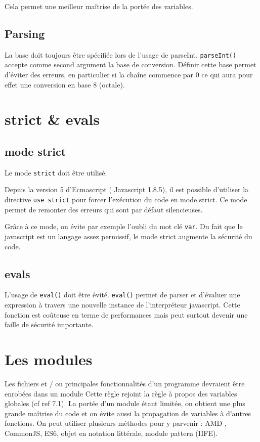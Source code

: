 			Cela permet une meilleur maîtrise de la portée des variables.

		\subsection{Parsing}
			La base doit toujours être spécifiée lors de l'usage de parseInt. \verb+parseInt()+ accepte comme second argument la base de conversion. Définir cette base permet d'éviter des erreurs, en particulier si la chaîne commence par 0 ce qui aura pour effet une conversion en base 8 (octale).

	\section{strict \& evals}
		\subsection{mode strict}
			Le mode \verb+strict+ doit être utilisé.

			Depuis la version 5 d'Ecmascript ( Javascript 1.8.5), il est possible d'utiliser la directive \verb+use strict+ pour forcer l'exécution du code en mode strict. Ce mode permet de remonter des erreurs qui sont par défaut silencieuses.

			Grâce à ce mode, on évite par exemple l'oubli du mot clé \verb+var+. Du fait que le javascript est un langage assez permissif, le mode strict augmente la sécurité du code.

		\subsection{evals}
			L'usage de \verb+eval()+ doit être évité. \verb+eval()+ permet de parser et d'évaluer une expression à travers une nouvelle instance de l'interpréteur javascript. Cette fonction est coûteuse en terme de performances mais peut surtout devenir une faille de sécurité importante.

	\section{Les modules}
		Les fichiers et / ou principales fonctionnalités d'un programme devraient être enrobées dans un module Cette règle rejoint la règle à propos des variables globales (cf ref 7.1). La portée d'un module étant limitée, on obtient une plus grande maîtrise du code et on évite aussi la propagation de variables à d'autres fonctions. On peut utiliser plusieurs méthodes pour y parvenir : AMD , CommonJS, ES6, objet en notation littérale, module pattern (IIFE).

